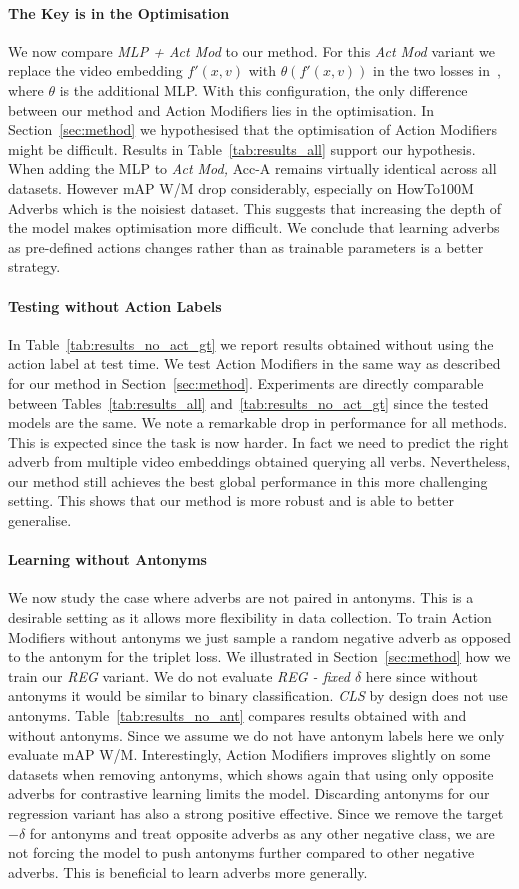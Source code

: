 \documentclass[10pt,twocolumn,letterpaper]{article}
\newcommand{\fparagraph}[1]{\paragraph{#1}}
\begin{document}
\vspace{-15pt}
\fparagraph{The Key is in the Optimisation} We now compare \textit{MLP + Act Mod} to our method.
For this \textit{Act Mod} variant we replace the video embedding $f'(x, v)$ with $\theta(f'(x, v))$ in the two losses in~\cite{doughty2020action}, where $\theta$ is the additional MLP. With this configuration, the only difference between our method and Action Modifiers lies in the optimisation. 
In Section~\ref{sec:method} we hypothesised that the optimisation of Action Modifiers might be difficult. Results in Table~\ref{tab:results_all} support our hypothesis. When adding the MLP to \textit{Act Mod,} Acc-A remains virtually identical across all datasets. However mAP W/M drop considerably, especially on HowTo100M Adverbs which is the noisiest dataset. This suggests that increasing the depth of the model makes optimisation more difficult.
We conclude that learning adverbs as pre-defined actions changes rather than as trainable parameters is a better strategy.

\vspace{-15pt}
\fparagraph{Testing without Action Labels} In Table~\ref{tab:results_no_act_gt} we report results obtained without using the action label at test time. 
We test Action Modifiers in the same way as described for our method in Section~\ref{sec:method}.
Experiments are directly comparable between Tables~\ref{tab:results_all} and~\ref{tab:results_no_act_gt} since the tested models are the same. 
We note a remarkable drop in performance 
for all methods. This is expected since the task is now harder. 
In fact 
we need to predict the right adverb from multiple video embeddings obtained querying all verbs. 
Nevertheless, our method still achieves the best global performance in this more challenging setting. 
This shows that our method is more robust and is able to better generalise. 

\vspace{-15pt}
\fparagraph{Learning without Antonyms} We now study the case where adverbs are not paired in antonyms. This is a desirable setting as it 
allows more flexibility in data collection. To train Action Modifiers without antonyms we just sample a random negative adverb as opposed to the antonym for the triplet loss. 
We illustrated in Section~\ref{sec:method} how we train our \textit{REG} variant.
We do not evaluate \textit{REG - fixed $\delta$} here since without antonyms it would be similar to binary classification. 
\textit{CLS} 
by design does not use antonyms. 
Table~\ref{tab:results_no_ant} compares results obtained with and without antonyms. Since we assume we do not have antonym labels here we only evaluate mAP W/M.  
Interestingly, Action Modifiers improves slightly on some datasets when removing antonyms, which shows again that 
using only opposite adverbs for contrastive learning limits the model. 
Discarding antonyms for our regression variant has also a strong positive effective. Since we remove the target $-\delta$ for antonyms and treat opposite adverbs as any other negative class, we are not forcing the model to push antonyms further compared to other negative adverbs. This is beneficial to learn adverbs more generally. 
\end{document}
